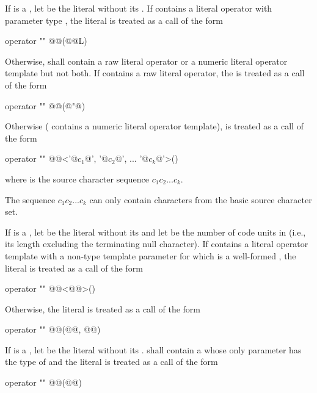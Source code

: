 \pnum
If  is a , let  be the
literal without its . If  contains a literal operator
with parameter type , the literal  is treated as a call of
the form
\begin{codeblock}
operator "" @@(@@L)
\end{codeblock}
Otherwise,  shall contain a raw literal operator
or a numeric literal operator template but not both.
If  contains a raw literal operator,
the   is treated as a call of the form
\begin{codeblock}
operator "" @@(@"@)
\end{codeblock}
Otherwise ( contains a numeric literal operator template),
 is treated as a call of the form
\begin{codeblock}
operator "" @@<'@$c_1$@', '@$c_2$@', ... '@$c_k$@'>()
\end{codeblock}
where  is the source character sequence $c_1c_2...c_k$.
\begin{note}
The sequence
$c_1c_2...c_k$ can only contain characters from the basic source character set.
\end{note}

\pnum
If  is a ,
let  be the literal without its 
and let  be the number of code units in 
(i.e., its length excluding the terminating null character).
If  contains a literal operator template with
a non-type template parameter for which  is
a well-formed ,
the literal  is treated as a call of the form
\begin{codeblock}
operator "" @@<@@>()
\end{codeblock}
Otherwise, the literal  is treated as a call of the form
\begin{codeblock}
operator "" @@(@@, @@)
\end{codeblock}

\pnum
If  is a , let  be the
literal without its .
 shall contain a  whose only parameter has
the type of  and the
literal  is treated as a call
of the form
\begin{codeblock}
operator "" @@(@@)
\end{codeblock}


